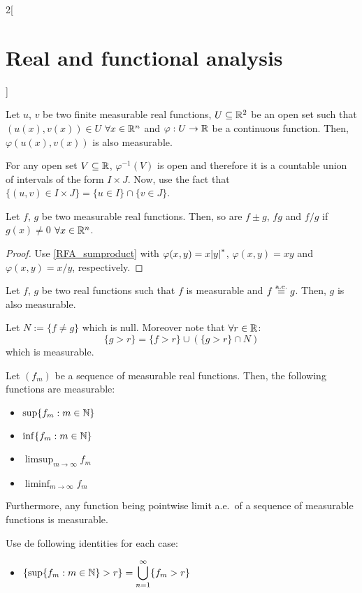 \documentclass[../../../main_math.tex]{subfiles}
\begin{document}
\begin{multicols}{2}[\section{Real and functional analysis}]
\begin{proposition}
    Let $u$, $v$ be two finite measurable real functions, $U\subseteq\mathbb{R}^2$ be an open set such that $(u(x),v(x))\in U$ $\forall x\in\mathbb{R}^n$ and $\varphi:U\rightarrow\mathbb{R}$ be a continuous function. Then, $\varphi(u(x),v(x))$ is also measurable.
  \end{proposition}
  \begin{sproof}
    For any open set $V\subseteq\mathbb{R}$, $\varphi^{-1}(V)$ is open and therefore it is a countable union of intervals of the form $I\times J$. Now, use the fact that $\{(u,v)\in I\times J\}=\{u\in I\}\cap\{v\in J\}$.
  \end{sproof}
  \begin{proposition}
    Let $f$, $g$ be two measurable real functions. Then, so are $f\pm g$, $fg$ and $f/g$ if $g(x)\ne 0$ $\forall x\in\mathbb{R}^n$.
  \end{proposition}
  \begin{proof}
    Use \cref{RFA_sumproduct} with $\varphi(x,y)=x\om y$, $\varphi(x,y)=xy$ and $\varphi(x,y)=x/y$, respectively.
  \end{proof}
  \begin{proposition}
    Let $f$, $g$ be two real functions such that $f$ is measurable and $f\overset{\text{a.e.}}{=} g$. Then, $g$ is also measurable.
  \end{proposition}
  \begin{sproof}
    Let $N:=\{f\ne g\}$ which is null. Moreover note that $\forall r\in\mathbb{R}$:
    $$\{g>r\}=\{f>r\} \cup (\{g>r\}\cap N)$$
    which is measurable.
  \end{sproof}
  \begin{proposition}
    Let $(f_m)$ be a sequence of measurable real functions. Then, the following functions are measurable:
    \begin{itemize}
      \item $\displaystyle\sup\{f_m:m\in\mathbb{N}\}$
      \item $\displaystyle\inf\{f_m:m\in\mathbb{N}\}$
      \item $\displaystyle\limsup_{m\to\infty} f_m$
      \item $\displaystyle\liminf_{m\to\infty} f_m$
    \end{itemize}
    Furthermore, any function being pointwise limit a.e.\ of a sequence of measurable functions is measurable.
  \end{proposition}
  \begin{sproof}
    Use de following identities for each case:
    \begin{itemize}
      \item $\displaystyle\{\sup\{f_m:m\in\mathbb{N}\}>r\}=\bigcup_{n=1}^\infty \{f_m> r\}$

\end{itemize}
\end{sproof}
\end{multicols}
\end{document}

